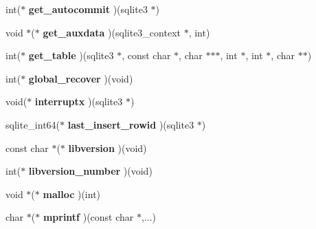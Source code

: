 \begin{DoxyCompactItemize}
int($\ast$ {\bfseries get\+\_\+autocommit} )(sqlite3 $\ast$)
\item 
\mbox{\label{structsqlite3__api__routines_a1eb728229d0ff6e3bc3c5f25a4058060}} 
void $\ast$($\ast$ {\bfseries get\+\_\+auxdata} )(sqlite3\+\_\+context $\ast$, int)
\item 
\mbox{\label{structsqlite3__api__routines_a49be6136a17441b04e3feec330d9dd52}} 
int($\ast$ {\bfseries get\+\_\+table} )(sqlite3 $\ast$, const char $\ast$, char $\ast$$\ast$$\ast$, int $\ast$, int $\ast$, char $\ast$$\ast$)
\item 
\mbox{\label{structsqlite3__api__routines_a9b90b5ea9b2fae5a60b9ddc86c72e1a8}} 
int($\ast$ {\bfseries global\+\_\+recover} )(void)
\item 
\mbox{\label{structsqlite3__api__routines_a3cfec591003c4e8b1f1bdb82a80b8e19}} 
void($\ast$ {\bfseries interruptx} )(sqlite3 $\ast$)
\item 
\mbox{\label{structsqlite3__api__routines_aeeda8d84c8060c99e24d97ae60bf6046}} 
sqlite\+\_\+int64($\ast$ {\bfseries last\+\_\+insert\+\_\+rowid} )(sqlite3 $\ast$)
\item 
\mbox{\label{structsqlite3__api__routines_a126a447b5724f50142603d94d9470336}} 
const char $\ast$($\ast$ {\bfseries libversion} )(void)
\item 
\mbox{\label{structsqlite3__api__routines_a70d0b04a52493c15f26815990a50afa7}} 
int($\ast$ {\bfseries libversion\+\_\+number} )(void)
\item 
\mbox{\label{structsqlite3__api__routines_a37193f93e0626dae6e302d0bd47de4cf}} 
void $\ast$($\ast$ {\bfseries malloc} )(int)
\item 
\mbox{\label{structsqlite3__api__routines_a82cc01d97e2552bad02554ed50e4d2b8}} 
char $\ast$($\ast$ {\bfseries mprintf} )(const char $\ast$,...)
\item 
\mbox{\label{structsqlite3__api__routines_a1d0126d7384e1e4e0975d3084007af89}} 
$$
\end{DoxyCompactItemize}
